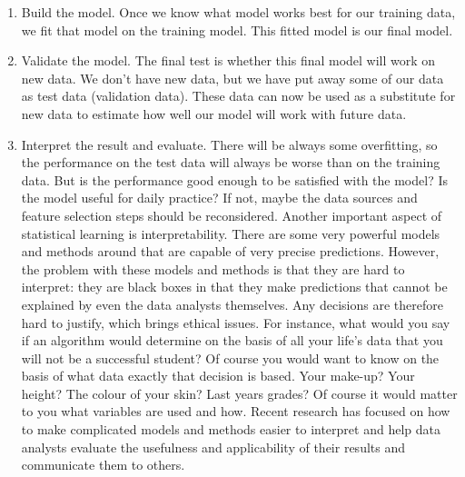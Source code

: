 \documentclass[]{book}\usepackage[]{graphicx}\usepackage[]{color}
\begin{document}
\begin{enumerate}
\item
Build the model.
Once we know what model works best for our training data, we fit that model on the training model. This fitted model is our final model. 

\item
Validate the model. 
The final test is whether this final model will work on new data. We don't have new data, but we have put away some of our data as test data (validation data). These data can now be used as a substitute for new data to estimate how well our model will work with future data.  

\item
Interpret the result and evaluate.
There will be always some overfitting, so the performance on the test data will always be worse than on the training data. But is the performance good enough to be satisfied with the model? Is the model useful for daily practice? If not, maybe the data sources and feature selection steps should be reconsidered.
Another important aspect of statistical learning is interpretability. There are some very powerful models and methods around that are capable of very precise predictions. However, the problem with these models and methods is that they are hard to interpret: they are black boxes in that they make predictions that cannot be explained by even the data analysts themselves. Any decisions are therefore hard to justify, which brings ethical issues. For instance, what would you say if an algorithm would determine on the basis of all your life's data that you will not be a successful student? Of course you would want to know on the basis of what data exactly that decision is based. Your make-up? Your height? The colour of your skin? Last years grades? Of course it would matter to you what variables are used and how. Recent research has focused on how to make complicated models and methods easier to interpret and help data analysts evaluate the usefulness and applicability of their results and communicate them to others.
\end{enumerate}
\end{document}
